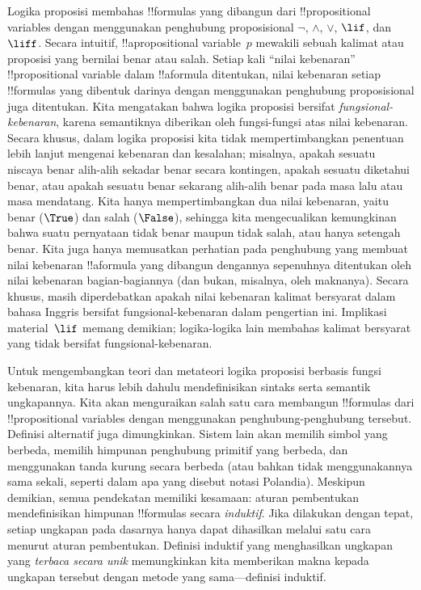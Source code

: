 \documentclass[../../../include/open-logic-section]{subfiles}
\begin{document}


Logika proposisi membahas !!{formula}s yang dibangun dari
!!{propositional variable}s dengan menggunakan penghubung proposisional
$\lnot$, $\land$, $\lor$, $\lif$, dan $\liff$. Secara intuitif,
!!a{propositional variable}~$p$ mewakili sebuah kalimat atau proposisi
yang bernilai benar atau salah. Setiap kali ``nilai kebenaran''
!!{propositional variable} dalam !!a{formula} ditentukan, nilai kebenaran
setiap !!{formula}s yang dibentuk darinya dengan menggunakan penghubung
proposisional juga ditentukan. Kita mengatakan bahwa logika proposisi
bersifat \emph{fungsional-kebenaran}, karena semantiknya diberikan oleh
fungsi-fungsi atas nilai kebenaran. Secara khusus, dalam logika proposisi
kita tidak mempertimbangkan penentuan lebih lanjut mengenai kebenaran dan
kesalahan; misalnya, apakah sesuatu niscaya benar alih-alih sekadar benar
secara kontingen, apakah sesuatu diketahui benar, atau apakah sesuatu benar
sekarang alih-alih benar pada masa lalu atau masa mendatang. Kita hanya
mempertimbangkan dua nilai kebenaran, yaitu benar ($\True$) dan salah
($\False$), sehingga kita mengecualikan kemungkinan bahwa suatu pernyataan
tidak benar maupun tidak salah, atau hanya setengah benar. Kita juga hanya
memusatkan perhatian pada penghubung yang membuat nilai kebenaran
!!a{formula} yang dibangun dengannya sepenuhnya ditentukan oleh nilai
kebenaran bagian-bagiannya (dan bukan, misalnya, oleh maknanya). Secara
khusus, masih diperdebatkan apakah nilai kebenaran kalimat bersyarat dalam
bahasa Inggris bersifat fungsional-kebenaran dalam pengertian ini. Implikasi
material~$\lif$ memang demikian; logika-logika lain membahas kalimat
bersyarat yang tidak bersifat fungsional-kebenaran.

Untuk mengembangkan teori dan metateori logika proposisi berbasis fungsi
kebenaran, kita harus lebih dahulu mendefinisikan sintaks serta
semantik ungkapannya. Kita akan menguraikan salah satu cara
membangun !!{formula}s dari !!{propositional variable}s dengan menggunakan
penghubung-penghubung tersebut. Definisi alternatif juga dimungkinkan.
Sistem lain akan memilih simbol yang berbeda, memilih himpunan penghubung
primitif yang berbeda, dan menggunakan tanda kurung secara berbeda (atau
bahkan tidak menggunakannya sama sekali, seperti dalam apa yang disebut
notasi Polandia). Meskipun demikian, semua pendekatan memiliki kesamaan:
aturan pembentukan mendefinisikan himpunan !!{formula}s secara
\emph{induktif}. Jika dilakukan dengan tepat, setiap ungkapan pada dasarnya
hanya dapat dihasilkan melalui satu cara menurut aturan pembentukan.
Definisi induktif yang menghasilkan ungkapan yang \emph{terbaca secara
unik} memungkinkan kita memberikan makna kepada ungkapan tersebut dengan
metode yang sama---definisi induktif.
\end{document}
